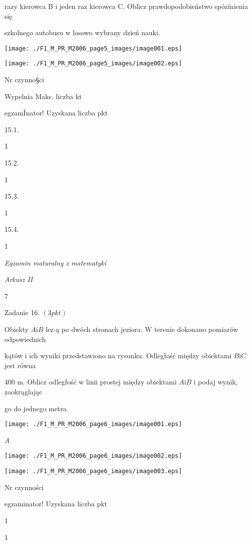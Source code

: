 \documentclass[a4paper,12pt]{article}
\begin{document}
razy kierowca $\mathrm{B}$ i jeden raz kierowca C. Oblicz prawdopodobieństwo spózínienia się

szkolnego autobusu w losowo wybrany dzień nauki.
\begin{center}
\texttt{[image: ./F1\_M\_PR\_M2006\_page5\_images/image001.eps]}

\texttt{[image: ./F1\_M\_PR\_M2006\_page5\_images/image002.eps]}
\end{center}
Nr czynno\S ci

Wypelnia Maks. liczba kt

egzamÍnator! Uzyskana liczba pkt

15.1.

1

15.2.

1

15.3.

1

15.4.

1





{\it Egzamin maturalny z matematyki}

{\it Arkusz II}

7

Zadanie 16. $(3pkt)$

Obiekty $A\mathrm{i}B$ lez$\cdot$ą po dwóch stronach jeziora. $\mathrm{W}$ terenie dokonano pomiarów odpowiednich

kątów i ich wyniki przedstawiono na rysunku. Odległość między obiektami $B\mathrm{i}C$ jest równa

400 $\mathrm{m}$. Oblicz odległość w linii prostej między obiektami $A\mathrm{i}B$ i podaj wynik, zaokrąglając

go do jednego metra.
\begin{center}
\texttt{[image: ./F1\_M\_PR\_M2006\_page6\_images/image001.eps]}
\end{center}
{\it A}
\begin{center}
\texttt{[image: ./F1\_M\_PR\_M2006\_page6\_images/image002.eps]}

\texttt{[image: ./F1\_M\_PR\_M2006\_page6\_images/image003.eps]}
\end{center}
Nr czynności

egzaminator! Uzyskana liczba pkt

1

1
\end{document}
